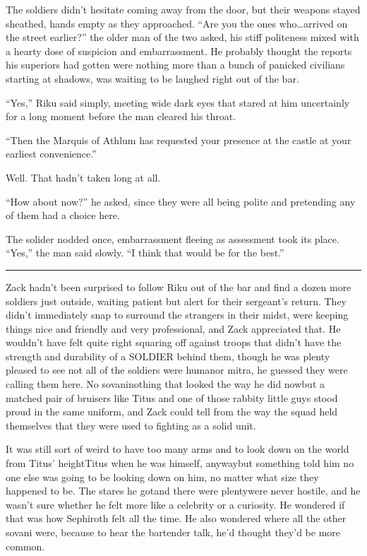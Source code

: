 The soldiers didn't hesitate coming away from the door, but their weapons stayed sheathed, hands empty as they approached. ``Are you the ones who\ldots arrived on the street earlier?'' the older man of the two asked, his stiff politeness mixed with a hearty dose of suspicion and embarrassment. He probably thought the reports his superiors had gotten were nothing more than a bunch of panicked civilians starting at shadows, was waiting to be laughed right out of the bar.

``Yes,'' Riku said simply, meeting wide dark eyes that stared at him uncertainly for a long moment before the man cleared his throat.

``Then the Marquis of Athlum has requested your presence at the castle at your earliest convenience.''

Well. That hadn't taken long at all.

``How about now?'' he asked, since they were all being polite and pretending any of them had a choice here.

The solider nodded once, embarrassment fleeing as assessment took its place. ``Yes,'' the man said slowly. ``I think that would be for the best.''

\fancybreak{\pfbreakdisplay}


Zack hadn't been surprised to follow Riku out of the bar and find a dozen more soldiers just outside, waiting patient but alert for their sergeant's return. They didn't immediately snap to surround the strangers in their midst, were keeping things nice and friendly and very professional, and Zack appreciated that. He wouldn't have felt quite right squaring off against troops that didn't have the strength and durability of a SOLDIER behind them, though he was plenty pleased to see not all of the soldiers were human\textemdash or mitra, he guessed they were calling them here. No sovani\textemdash nothing that looked the way he did now\textemdash but a matched pair of bruisers like Titus and one of those rabbity little guys stood proud in the same uniform, and Zack could tell from the way the squad held themselves that they were used to fighting as a solid unit.

It was still sort of weird to have too many arms and to look down on the world from Titus' height\textemdash Titus when he was himself, anyway\textemdash but something told him no one else was going to be looking down on him, no matter what size they happened to be. The stares he got\textemdash and there were plenty\textemdash were never hostile, and he wasn't sure whether he felt more like a celebrity or a curiosity. He wondered if that was how Sephiroth felt all the time. He also wondered where all the other sovani were, because to hear the bartender talk, he'd thought they'd be more common.

